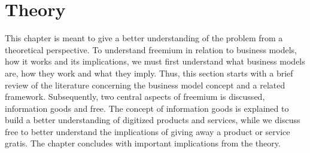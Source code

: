 \chapter{Theory}
\label{chapter:theory}

This chapter is meant to give a better understanding of the problem from a theoretical perspective. To understand freemium in relation to business models, how it works and its implications, we must first understand what business models are, how they work and what they imply. Thus, this section starts with a brief review of the literature concerning the business model concept and a related framework. Subsequently, two central aspects of freemium is discussed, information goods and free. The concept of information goods is explained to build a better understanding of digitized products and services, while we discuss free to better understand the implications of giving away a product or service gratis. The chapter concludes with important implications from the theory.




